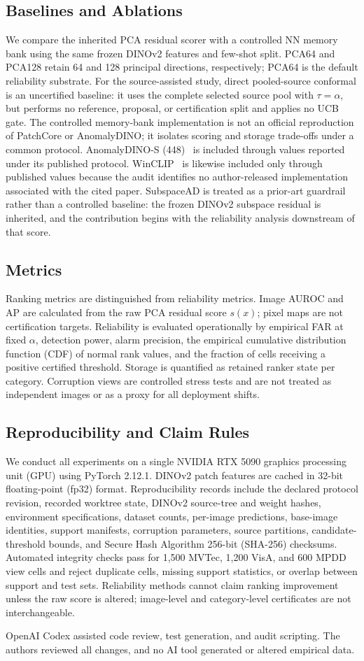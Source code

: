 \subsection{Baselines and Ablations}
We compare the inherited PCA residual scorer with a controlled NN memory bank using the same frozen DINOv2 features and few-shot split. PCA64 and PCA128 retain 64 and 128 principal directions, respectively; PCA64 is the default reliability substrate. For the source-assisted study, direct pooled-source conformal is an uncertified baseline: it uses the complete selected source pool with $\tau=\alpha$, but performs no reference, proposal, or certification split and applies no UCB gate. The controlled memory-bank implementation is not an official reproduction of PatchCore or AnomalyDINO; it isolates scoring and storage trade-offs under a common protocol. AnomalyDINO-S (448)~\cite{damm2025anomalydino} is included through values reported under its published protocol. WinCLIP~\cite{winclip2023} is likewise included only through published values because the audit identifies no author-released implementation associated with the cited paper. SubspaceAD is treated as a prior-art guardrail rather than a controlled baseline: the frozen DINOv2 subspace residual is inherited, and the contribution begins with the reliability analysis downstream of that score.

\subsection{Metrics}
Ranking metrics are distinguished from reliability metrics. Image AUROC and AP are calculated from the raw PCA residual score $s(x)$; pixel maps are not certification targets. Reliability is evaluated operationally by empirical FAR at fixed $\alpha$, detection power, alarm precision, the empirical cumulative distribution function (CDF) of normal rank values, and the fraction of cells receiving a positive certified threshold. Storage is quantified as retained ranker state per category. Corruption views are controlled stress tests and are not treated as independent images or as a proxy for all deployment shifts.

\subsection{Reproducibility and Claim Rules}
We conduct all experiments on a single NVIDIA RTX 5090 graphics processing unit (GPU) using PyTorch 2.12.1. DINOv2 patch features are cached in 32-bit floating-point (fp32) format. Reproducibility records include the declared protocol revision, recorded worktree state, DINOv2 source-tree and weight hashes, environment specifications, dataset counts, per-image predictions, base-image identities, support manifests, corruption parameters, source partitions, candidate-threshold bounds, and Secure Hash Algorithm 256-bit (SHA-256) checksums. Automated integrity checks pass for 1,500 MVTec, 1,200 VisA, and 600 MPDD view cells and reject duplicate cells, missing support statistics, or overlap between support and test sets. Reliability methods cannot claim ranking improvement unless the raw score is altered; image-level and category-level certificates are not interchangeable.

OpenAI Codex assisted code review, test generation, and audit scripting. The authors reviewed all changes, and no AI tool generated or altered empirical data.

